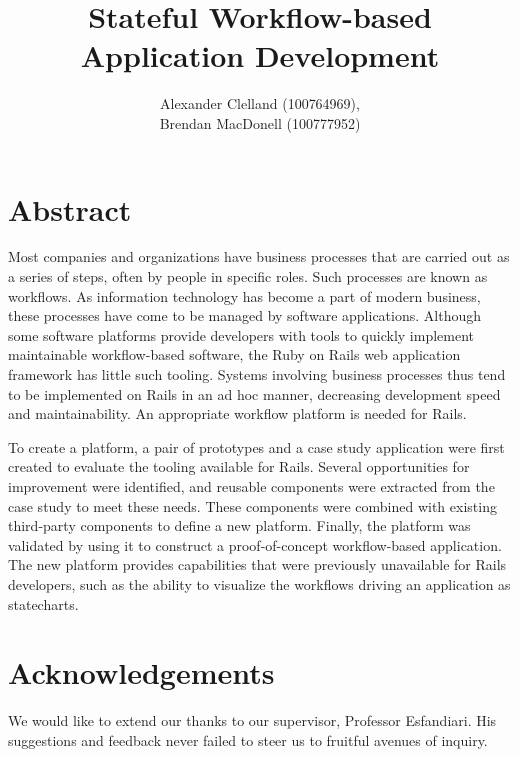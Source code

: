\documentclass[document.tex]{subfiles}
\begin{document}
\title{Stateful Workflow-based\\Application Development}
\author{
  Alexander Clelland (100764969), \\
  Brendan MacDonell (100777952)
}
\copyrightfalse %

\beforepreface

\chapter*{Abstract}
Most companies and organizations have business processes that are carried out as a series of steps, often by people in specific roles. Such processes are known as workflows. As information technology has become a part of modern business, these processes have come to be managed by software applications. Although some software platforms provide developers with tools to quickly implement maintainable workflow-based software, the Ruby on Rails web application framework has little such tooling. Systems involving business processes thus tend to be implemented on Rails in an ad hoc manner, decreasing development speed and maintainability. An appropriate workflow platform is needed for Rails.

To create a platform, a pair of prototypes and a case study application were first created to evaluate the tooling available for Rails. Several opportunities for improvement were identified, and reusable components were extracted from the case study to meet these needs. These components were combined with existing third-party components to define a new platform. Finally, the platform was validated by using it to construct a proof-of-concept workflow-based application. The new platform provides capabilities that were previously unavailable for Rails developers, such as the ability to visualize the workflows driving an application as statecharts.


\chapter*{Acknowledgements}


We would like to extend our thanks to our supervisor, Professor Esfandiari.
His suggestions and feedback never failed to steer us to fruitful avenues of inquiry.
\end{document}
